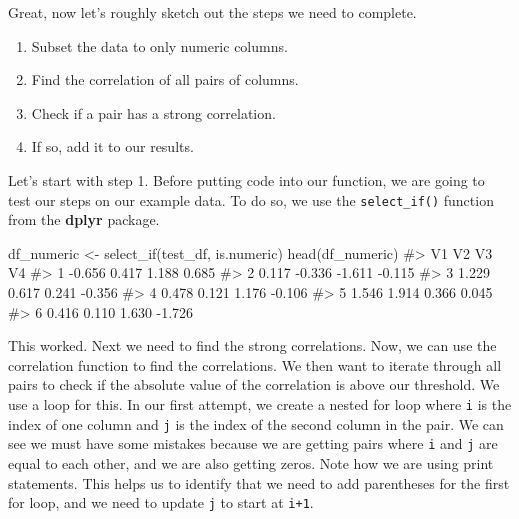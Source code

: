 \documentclass[
  letterpaper,
]{latex/krantz}
\makeatletter
\newenvironment{Shaded}{\begin{snugshade}}{\end{snugshade}}
\newcommand{\CommentTok}[1]{\textcolor[rgb]{0.37,0.37,0.37}{#1}}
\newcommand{\FunctionTok}[1]{\textcolor[rgb]{0.28,0.35,0.67}{#1}}
\newcommand{\NormalTok}[1]{\textcolor[rgb]{0.00,0.23,0.31}{#1}}
\newcommand{\OtherTok}[1]{\textcolor[rgb]{0.00,0.23,0.31}{#1}}
\providecommand{\tightlist}{%
  \setlength{\itemsep}{0pt}\setlength{\parskip}{0pt}}\usepackage{longtable,booktabs,array}
\newenvironment{kframe}{%
\medskip{}
\setlength{\fboxsep}{.8em}
 \def\at@end@of@kframe{}%
 \ifinner\ifhmode%
  \def\at@end@of@kframe{\end{minipage}}%
  \begin{minipage}{\columnwidth}%
 \fi\fi%
 \def\FrameCommand##1{\hskip\@totalleftmargin \hskip-\fboxsep
 \colorbox{shadecolor}{##1}\hskip-\fboxsep
     \hskip-\linewidth \hskip-\@totalleftmargin \hskip\columnwidth}%
 \MakeFramed {\advance\hsize-\width
   \@totalleftmargin\z@ \linewidth\hsize
   \@setminipage}}%
 {\par\unskip\endMakeFramed%
 \at@end@of@kframe}
\renewenvironment{Shaded}{\begin{kframe}}{\end{kframe}}
\makeatother
\begin{document}
Great, now let's roughly sketch out the steps we need to complete.

\begin{enumerate}
\def\labelenumi{\arabic{enumi}.}
\tightlist
\item
  Subset the data to only numeric columns.
\item
  Find the correlation of all pairs of columns.
\item
  Check if a pair has a strong correlation.
\item
  If so, add it to our results.
\end{enumerate}

Let's start with step 1. Before putting code into our function, we are
going to test our steps on our example data. To do so, we use the
\texttt{select\_if()}
function from the \textbf{dplyr} package.

\begin{Shaded}
\begin{Highlighting}[]
\NormalTok{df\_numeric }\OtherTok{\textless{}{-}} \FunctionTok{select\_if}\NormalTok{(test\_df, is.numeric)}
\FunctionTok{head}\NormalTok{(df\_numeric)}
\CommentTok{\#\textgreater{}       V1     V2     V3     V4}
\CommentTok{\#\textgreater{} 1 {-}0.656  0.417  1.188  0.685}
\CommentTok{\#\textgreater{} 2  0.117 {-}0.336 {-}1.611 {-}0.115}
\CommentTok{\#\textgreater{} 3  1.229  0.617  0.241 {-}0.356}
\CommentTok{\#\textgreater{} 4  0.478  0.121  1.176 {-}0.106}
\CommentTok{\#\textgreater{} 5  1.546  1.914  0.366  0.045}
\CommentTok{\#\textgreater{} 6  0.416  0.110  1.630 {-}1.726}
\end{Highlighting}
\end{Shaded}

This worked. Next we need to find the strong correlations. Now, we can
use the correlation function to find the correlations. We then want to
iterate through all pairs to check if the absolute value of the
correlation is above our threshold. We use a loop for this. In our first
attempt, we create a nested for loop where \texttt{i} is the index of
one column and \texttt{j} is the index of the second column in the pair.
We can see we must have some mistakes because we are getting pairs where
\texttt{i} and \texttt{j} are equal to each other, and we are also
getting zeros. Note how we are using print statements. This helps us to
identify that we need to add parentheses for the first for loop, and we
need to update \texttt{j} to start at \texttt{i+1}.
\end{document}
